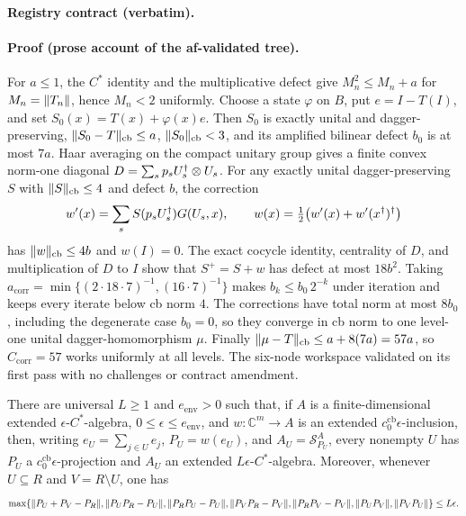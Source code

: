 \noindent\textbf{Registry contract (verbatim).}

\paragraph{Proof (prose account of the af-validated tree).}
For $a\le1$, the $C^{*}$ identity and the multiplicative defect give
$M_n^2\le M_n+a$ for $M_n=\lVert T_n\rVert$, hence $M_n<2$ uniformly.  Choose a
state $\varphi$ on $B$, put $e=I-T(I)$, and set
$S_0(x)=T(x)+\varphi(x)e$.  Then $S_0$ is exactly unital and dagger-preserving,
$\lVert S_0-T\rVert_{\mathrm{cb}}\le a$, $\lVert S_0\rVert_{\mathrm{cb}}<3$, and its amplified
bilinear defect $b_0$ is at most $7a$.  Haar averaging on the compact unitary
group gives a finite convex norm-one diagonal
$D=\sum_s p_sU_s^{\dagger}\otimes U_s$.  For any exactly unital dagger-preserving
$S$ with $\lVert S\rVert_{\mathrm{cb}}\le4$ and defect $b$, the correction
\[
 w'(x)=\sum_sS(p_sU_s^{\dagger})G(U_s,x),\qquad
 w(x)=\tfrac12\bigl(w'(x)+w'(x^{\dagger})^{\dagger}\bigr)
\]
has $\lVert w\rVert_{\mathrm{cb}}\le4b$ and $w(I)=0$.  The exact cocycle identity,
centrality of $D$, and multiplication of $D$ to $I$ show that $S^{+}=S+w$
has defect at most $18b^2$.  Taking
$a_{\mathrm{corr}}=\min\{(2\cdot18\cdot7)^{-1},(16\cdot7)^{-1}\}$ makes
$b_k\le b_0\,2^{-k}$ under iteration and keeps every iterate below cb norm $4$.
The corrections have total norm at most $8b_0$, including the degenerate case
$b_0=0$, so they converge in cb norm to one level-one unital dagger-homomorphism
$\mu$.  Finally $\lVert \mu-T\rVert_{\mathrm{cb}}\le a+8(7a)=57a$, so
$C_{\mathrm{corr}}=57$ works uniformly at all levels.  The six-node workspace
validated on its first pass with no challenges or contract amendment.

\begin{lemma}\label{lem:maincb-direct-corner-envelope}
There are universal $L\ge1$ and $e_{\mathrm{env}}>0$ such that, if $A$ is a
finite-dimensional extended $\epsilon$-$C^{*}$-algebra,
$0\le\epsilon\le e_{\mathrm{env}}$, and
$w:\mathbb C^{m}\to A$ is an extended $c_{0}^{\mathrm{cb}}\epsilon$-inclusion,
then, writing $e_U=\sum_{j\in U}e_j$, $P_U=w(e_U)$, and
$A_U=\mathcal S^{A}_{P_U}$, every nonempty $U$ has $P_U$ a
$c_{0}^{\mathrm{cb}}\epsilon$-projection and $A_U$ an extended
$L\epsilon$-$C^{*}$-algebra.  Moreover, whenever $U\subseteq R$ and
$V=R\setminus U$, one has
\[
 \max\!\left\{
 \lVert P_U+P_V-P_R\rVert,
 \lVert P_UP_R-P_U\rVert,\lVert P_RP_U-P_U\rVert,
 \lVert P_VP_R-P_V\rVert,\lVert P_RP_V-P_V\rVert,
 \lVert P_UP_V\rVert,\lVert P_VP_U\rVert
 \right\}\le L\epsilon.
\]
\end{lemma}

